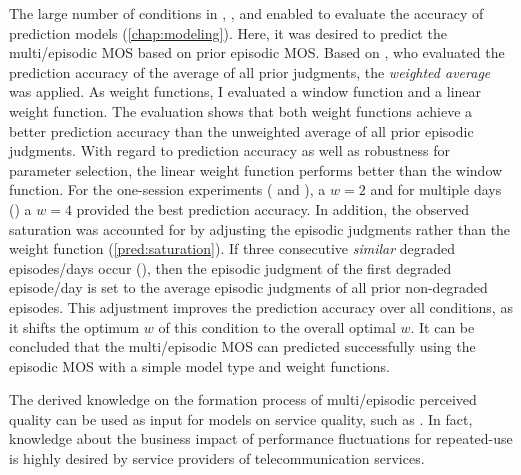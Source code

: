The large number of conditions in , \EIIa{}, and  enabled to evaluate the accuracy of prediction models (\autoref{chap:modeling}).
Here, it was desired to predict the multi\-/episodic \ac{MOS} based on prior episodic \ac{MOS}.
Based on \citet{moller_single-call_2011}, who evaluated the prediction accuracy of the average of all prior judgments, the \emph{weighted average} was applied.
As weight functions, I evaluated a window function and a linear weight function.
The evaluation shows that both weight functions achieve a better prediction accuracy than the unweighted average of all prior episodic judgments.
With regard to prediction accuracy as well as robustness for parameter selection, the linear weight function performs better than the window function.
For the one-session experiments ( and \EIIa{}), a $\mathit{w}=2$ and for multiple days () a $\mathit{w}=4$ provided the best prediction accuracy.
In addition, the observed saturation was accounted for by adjusting the episodic judgments rather than the weight function (\autoref{pred:saturation}).
If three consecutive \emph{similar} degraded episodes/days occur (), then the episodic judgment of the first degraded episode/day is set to the average episodic judgments of all prior non-degraded episodes.
This adjustment improves the prediction accuracy over all conditions, as it shifts the optimum $\mathit{w}$ of this condition to the overall optimal $\mathit{w}$.
It can be concluded that the multi\-/episodic \ac{MOS} can predicted successfully using the episodic \ac{MOS} with a simple model type and weight functions.

The derived knowledge on the formation process of multi\-/episodic perceived quality can be used as input for models on service quality, such as \citet{parasuraman_conceptual_1985}.
In fact, knowledge about the business impact of performance fluctuations for repeated-use is highly desired by service providers of telecommunication services.


